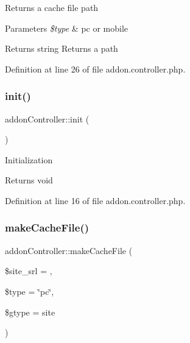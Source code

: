 Returns a cache file path


\begin{DoxyParams}{Parameters}
{\em \$type} & pc or mobile \\
\hline
\end{DoxyParams}
\begin{DoxyReturn}{Returns}
string Returns a path 
\end{DoxyReturn}


Definition at line 26 of file addon.\+controller.\+php.

\mbox{\label{classaddonController_a11ede7aecba420c2a5c7e55d8bab4013}} 
\subsubsection{\texorpdfstring{init()}{init()}}
{\footnotesize\ttfamily addon\+Controller\+::init (\begin{DoxyParamCaption}{ }\end{DoxyParamCaption})}

Initialization

\begin{DoxyReturn}{Returns}
void 
\end{DoxyReturn}


Definition at line 16 of file addon.\+controller.\+php.

\mbox{\label{classaddonController_a4d0e66e95c9d4a9822b03ce8df1bd545}} 
\subsubsection{\texorpdfstring{make\+Cache\+File()}{makeCacheFile()}}
{\footnotesize\ttfamily addon\+Controller\+::make\+Cache\+File (\begin{DoxyParamCaption}\item[{}]{\$site\+\_\+srl = {},  }\item[{}]{\$type = {\ttfamily \char`\"{}pc\char`\"{}},  }\item[{}]{\$gtype = {\ttfamily \textquotesingle{}site\textquotesingle{}} }\end{DoxyParamCaption})}

